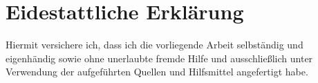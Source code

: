 \chapter*{\LARGE Eidestattliche Erklärung}
Hiermit versichere ich, dass ich die vorliegende Arbeit selbständig und eigenhändig sowie
ohne unerlaubte fremde Hilfe und ausschließlich unter Verwendung der aufgeführten
Quellen und Hilfsmittel angefertigt habe.


\vspace{30mm}
\hfill{}
\newpage